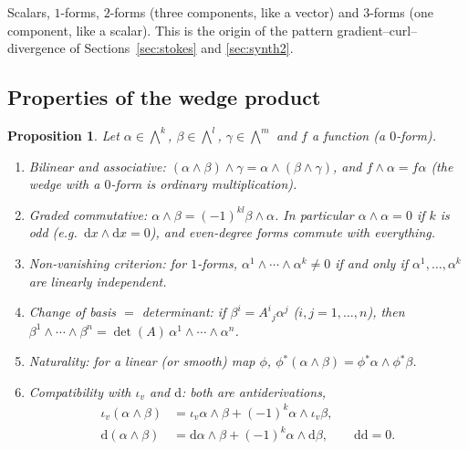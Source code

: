 \documentclass[11pt,a4paper]{article}
\newcounter{thm}[section]
\numberwithin{equation}{section}
\theoremstyle{definition}
\theoremstyle{plain}
\newtheorem{proposition}[thm]{Proposition}
\newcommand{\dd}{\mathrm{d}}
\newcommand{\pb}{{}^{*}}                            %
\newcommand{\eg}{\emph{e.g.}\ }
\begin{document}
\begin{specialcase}[$n=3$: dimensions $1,3,3,1$]
Scalars, $1$-forms, $2$-forms (three components, like a vector) and $3$-forms (one component, like a scalar). This is the origin of
the pattern gradient--curl--divergence of Sections~\ref{sec:stokes} and \ref{sec:synth2}.
\end{specialcase}

\subsection{Properties of the wedge product}\label{sec:wedgeprops}

\begin{proposition}\label{prop:wedgeprops}
Let $\alpha\in\bigwedge^k$, $\beta\in\bigwedge^l$, $\gamma\in\bigwedge^m$ and $f$ a function (a $0$-form).
\begin{enumerate}[label=(\alph*)]
\item \emph{Bilinear and associative:} $(\alpha\wedge\beta)\wedge\gamma=\alpha\wedge(\beta\wedge\gamma)$, and $f\wedge\alpha=f\alpha$ (the wedge with a $0$-form is ordinary multiplication).
\item \emph{Graded commutative:} $\alpha\wedge\beta=(-1)^{kl}\beta\wedge\alpha$. In particular $\alpha\wedge\alpha=0$ if $k$ is odd (\eg $\dd x\wedge\dd x=0$), and even-degree forms commute with everything.
\item \emph{Non-vanishing criterion:} for $1$-forms, $\alpha^1\wedge\cdots\wedge\alpha^k\neq0$ if and only if $\alpha^1,\dots,\alpha^k$ are linearly independent.
\item \emph{Change of basis $=$ determinant:} if $\beta^i=A^i{}_j\alpha^j$ ($i,j=1,\dots,n$), then $\beta^1\wedge\cdots\wedge\beta^n=\det(A)\,\alpha^1\wedge\cdots\wedge\alpha^n$.
\item \emph{Naturality:} for a linear (or smooth) map $\phi$, $\phi\pb(\alpha\wedge\beta)=\phi\pb\alpha\wedge\phi\pb\beta$.
\item \emph{Compatibility with $\iota_v$ and $\dd$:} both are antiderivations,
\begin{align}
\iota_v(\alpha\wedge\beta)&=\iota_v\alpha\wedge\beta+(-1)^k\alpha\wedge\iota_v\beta,\label{eq:antider}\\
\dd(\alpha\wedge\beta)&=\dd\alpha\wedge\beta+(-1)^k\alpha\wedge\dd\beta,\qquad \dd\dd=0.\label{eq:dleibniz}
\end{align}
\end{enumerate}
\end{proposition}
\end{document}
